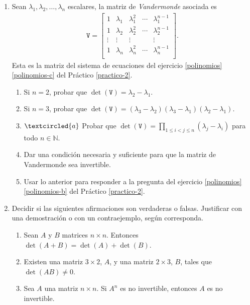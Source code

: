 \begin{enumerate}[topsep=6pt,itemsep=.4cm]
\item\label{vandermonde} Sean $\lambda_1, \lambda_2, \dots, \lambda_n$ escalares, la matriz de \emph{Vandermonde} asociada es
\begin{align*}
\mathtt V = \begin{bmatrix}
1 & \lambda_1 & \lambda_1^2 & \cdots & \lambda_1^{n-1}\\
1 & \lambda_2 & \lambda_2^2 & \cdots & \lambda_2^{n-1}\\
\vdots &\vdots &\vdots & &\vdots\\
1 & \lambda_n & \lambda_n^2 & \cdots & \lambda_n^{n-1}\\
\end{bmatrix}.
\end{align*}
Esta es la matriz del sistema de ecuaciones del ejercicio \ref{polinomios}\,\ref{polinomios-c} del Práctico \ref{practico-2}.


\begin{enumerate}
	\item Si $n=2$, probar que $\det(\mathtt V) = \lambda_2-\lambda_1$.
	\item Si $n=3$, probar que $\det(\mathtt V) = (\lambda_3-\lambda_2) (\lambda_3-\lambda_1) (\lambda_2-\lambda_1)$.
	\item\label{vandermonde gral} $\textcircled{a}$ Probar que $\det(\mathtt V) = \prod_{1\leq i< j \leq n}(\lambda_j-\lambda_i)$ para todo $n\in\mathbb{N}$.
	\item Dar una condición necesaria y suficiente para que la matriz de Vandermonde sea invertible.
	\item Usar lo anterior para responder a la pregunta del ejercicio \ref{polinomios}\,\ref{polinomios-b} del Práctico \ref{practico-2}.
	\end{enumerate}
	\item Decidir si las siguientes afirmaciones son verdaderas o falsas. Justificar con una demostración o con un contraejemplo, según corresponda.
	\begin{enumerate}
	\item Sean $A$ y $B$ matrices $n \times n$. Entonces $\det(A + B) = \det (A) + \det(B)$.
	\item Existen una matriz $3\times 2$, $A$, y una matriz $2\times 3$, $B$, tales que $\det(AB) \neq 0$.
	\item Sea $A$ una matriz $n\times n$. Si $A^n$ es no invertible, entonces $A$ es no invertible.
\end{enumerate}

\end{enumerate}



